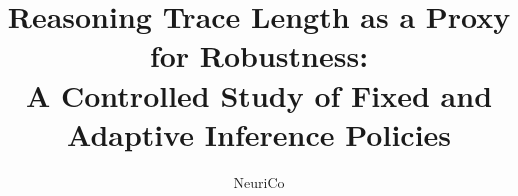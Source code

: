 \documentclass{article}
\title{Reasoning Trace Length as a Proxy for Robustness:\\A Controlled Study of Fixed and Adaptive Inference Policies}
\author{NeuriCo}
\begin{document}
\maketitle

\begin{abstract}

\end{abstract}









\end{document}
